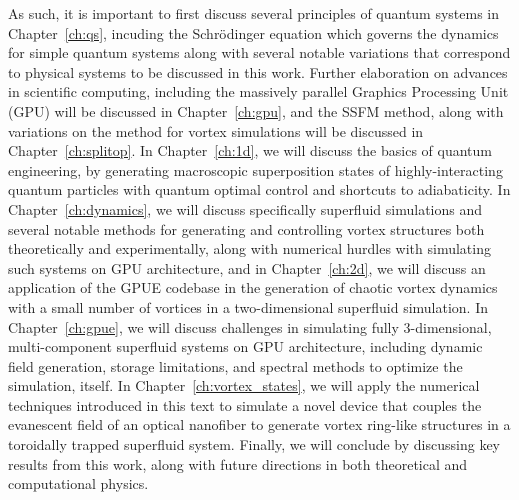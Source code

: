 As such, it is important to first discuss several principles of quantum systems in Chapter~\ref{ch:qs}, incuding the Schr\"odinger equation which governs the dynamics for simple quantum systems along with several notable variations that correspond to physical systems to be discussed in this work.
Further elaboration on advances in scientific computing, including the massively parallel Graphics Processing Unit (GPU) will be discussed in Chapter~\ref{ch:gpu}, and the SSFM method, along with variations on the method for vortex simulations will be discussed in Chapter~\ref{ch:splitop}.
In Chapter~\ref{ch:1d}, we will discuss the basics of quantum engineering, by generating macroscopic superposition states of highly-interacting quantum particles with quantum optimal control and shortcuts to adiabaticity.
In Chapter~\ref{ch:dynamics}, we will discuss specifically superfluid simulations and several notable methods for generating and controlling vortex structures both theoretically and experimentally, along with numerical hurdles with simulating such systems on GPU architecture, and in Chapter~\ref{ch:2d}, we will discuss an application of the GPUE codebase in the generation of chaotic vortex dynamics with a small number of vortices in a two-dimensional superfluid simulation.
In Chapter~\ref{ch:gpue}, we will discuss challenges in simulating fully 3-dimensional, multi-component superfluid systems on GPU architecture, including dynamic field generation, storage limitations, and spectral methods to optimize the simulation, itself.
In Chapter~\ref{ch:vortex_states}, we will apply the numerical techniques introduced in this text to simulate a novel device that couples the evanescent field of an optical nanofiber to generate vortex ring-like structures in a toroidally trapped superfluid system.
Finally, we will conclude by discussing key results from this work, along with future directions in both theoretical and computational physics.
